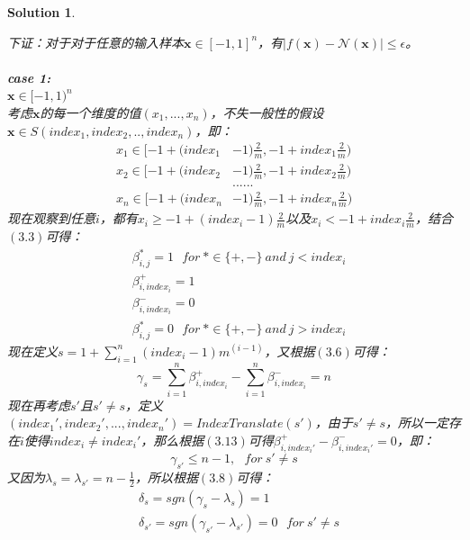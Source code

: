 \documentclass[a4paper,UTF8]{article}
\numberwithin{equation}{section}
\newtheorem*{solution}{Solution}
\begin{document}
\begin{solution}
\begin{enumerate}[ {(}1{)}]
下证：对于对于任意的输入样本$ \mathbf{x} \in [-1,1]^n $，有$|f(\mathbf{x}) - \mathcal{N}(\mathbf{x})| \leq \epsilon$。\\\\
\textbf{case 1:}\\
$ \mathbf{x} \in [-1,1)^n $\\
考虑$\mathbf{x}$的每一个维度的值$(x_1,...,x_n)$，不失一般性的假设$\mathbf{x} \in S(index_1, index_2,..,index_n)$，即：
\begin{equation}
\begin{aligned}
x_1 \in [-1+(index_1 &- 1)\frac{2}{m},-1 + index_1\frac{2}{m}) \\
x_2 \in [-1+(index_2 &- 1)\frac{2}{m},-1 + index_2\frac{2}{m}) \\
&......\\
x_n \in [-1+(index_n &- 1)\frac{2}{m},-1 + index_n\frac{2}{m})
\end{aligned}
\end{equation}
现在观察到任意$i$，都有$x_i \geq -1+(index_i - 1)\frac{2}{m}$以及$x_i < -1+index_i\frac{2}{m}$，结合$(3.3)$可得：
\begin{equation}
\begin{aligned}
&\beta_{i,j}^* = 1\ \ \ for\ *\in \{+,-\}\ and\ j < index_i\\
&\beta_{i,index_i}^+ = 1\\
&\beta_{i,index_i}^- = 0\\
&\beta_{i,j}^* = 0\ \ \ for\ *\in \{+,-\}\ and\ j > index_i
\end{aligned}
\end{equation}
现在定义$s= 1+\sum_{i=1}^{n}(index_i-1)m^{(i-1)}$，又根据$(3.6)$可得：
\begin{equation}
\gamma_s = \sum_{i=1}^{n}\beta_{i,index_i}^+ - \sum_{i=1}^{n}\beta_{i,index_i}^- = n
\end{equation}
现在再考虑$s'$且$s'\neq s$，定义$(index_1', index_2',...,index_n') = IndexTranslate(s')$，由于$s'\neq s$，所以一定存在$i$使得$index_i\neq index_i'$，那么根据$(3.13)$可得$\beta_{i,index_i'}^+ - \beta_{i,index_i'}^- = 0$，即：
\begin{equation}
\gamma_{s'} \leq n-1,\ \ \ for\ s'\neq s
\end{equation}
又因为$\lambda_s = \lambda_{s'} = n - \frac{1}{2}$，所以根据$(3.8)$可得：
\begin{equation}
\begin{aligned}
&\delta_s = sgn(\gamma_s - \lambda_s) = 1\\
&\delta_{s'} = sgn(\gamma_{s'} - \lambda_{s'}) = 0\ \ \ for\ s'\neq s

\end{aligned}
\end{equation}
\end{enumerate}
\end{solution}
\end{document}
